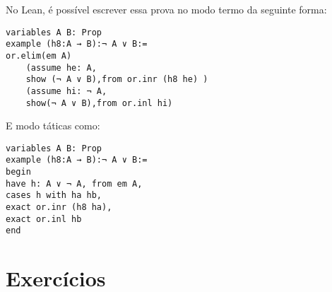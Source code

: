 No Lean, é possível escrever essa prova no modo termo da seguinte forma:
\begin{lstlisting}
variables A B: Prop
example (h8:A → B):¬ A ∨ B:=
or.elim(em A)
    (assume he: A,
    show (¬ A ∨ B),from or.inr (h8 he) )
    (assume hi: ¬ A,
    show(¬ A ∨ B),from or.inl hi)

\end{lstlisting}
E modo táticas como:
\begin{lstlisting}
variables A B: Prop
example (h8:A → B):¬ A ∨ B:=
begin
have h: A ∨ ¬ A, from em A,
cases h with ha hb,
exact or.inr (h8 ha),
exact or.inl hb
end
\end{lstlisting}

\section{Exercícios}
